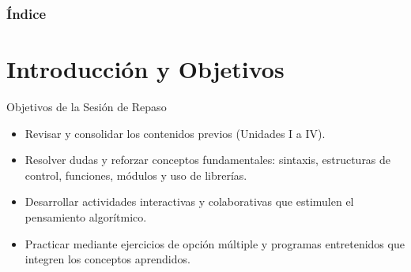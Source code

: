 \documentclass[10pt]{beamer}
\begin{document}

\begin{frame}
  \titlepage
\end{frame}

\begin{frame}
  \frametitle{Índice}
  \tableofcontents
\end{frame}

\section{Introducción y Objetivos}

\begin{frame}{Objetivos de la Sesión de Repaso}
  \begin{itemize}
    \item Revisar y consolidar los contenidos previos (Unidades I a IV).
    \item Resolver dudas y reforzar conceptos fundamentales: sintaxis, estructuras de control, funciones, módulos y uso de librerías.
    \item Desarrollar actividades interactivas y colaborativas que estimulen el pensamiento algorítmico.
    \item Practicar mediante ejercicios de opción múltiple y programas entretenidos que integren los conceptos aprendidos.
  \end{itemize}
\end{frame}

\end{document}

